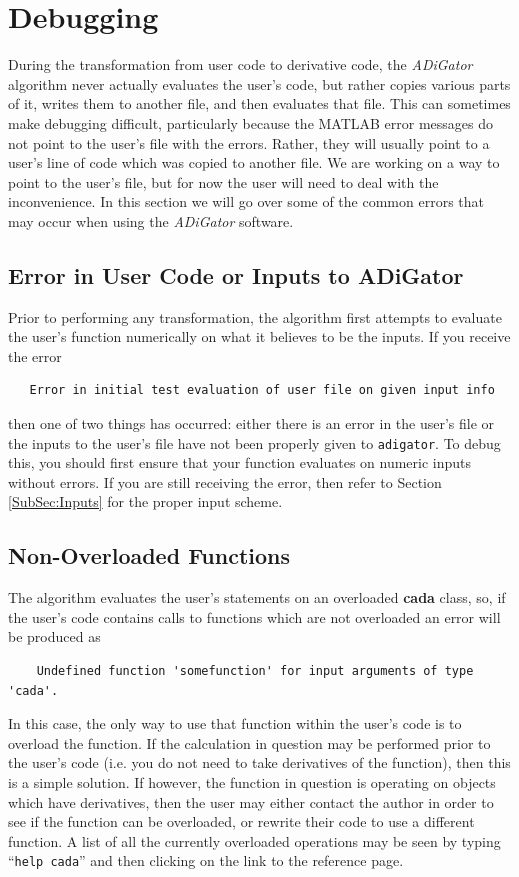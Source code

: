 \documentclass[10pt,pdftex]{article}
\begin{document}
\section{Debugging}
During the transformation from user code to derivative code, the \emph{ADiGator} algorithm never actually evaluates the user's code, but rather copies various parts of it, writes them to another file, and then evaluates that file. This can sometimes make debugging difficult, particularly because the MATLAB error messages do not point to the user's file with the errors. Rather, they will usually point to a user's line of code which was copied to another file. We are working on a way to point to the user's file, but for now the user will need to deal with the inconvenience.
In this section we will go over some of the common errors that may occur when using the \emph{ADiGator} software.
\subsection{Error in User Code or Inputs to ADiGator}
Prior to performing any transformation, the algorithm first attempts to evaluate the user's function numerically on what it believes to be the inputs.
If you receive the error
\begin{verbatim}
   Error in initial test evaluation of user file on given input info
\end{verbatim}
then one of two things has occurred: either there is an error in the user's file or the inputs to the user's file have not been properly given to \texttt{adigator}. To debug this, you should first ensure that your function evaluates on numeric inputs without errors. If you are still receiving the error, then refer to Section \ref{SubSec:Inputs} for the proper input scheme.
\subsection{Non-Overloaded Functions}
The algorithm evaluates the user's statements on an overloaded {\bf cada} class, so, if the user's code contains calls to functions which are not overloaded an error will be produced as
\begin{verbatim}
    Undefined function 'somefunction' for input arguments of type 'cada'.
\end{verbatim}
In this case, the only way to use that function within the user's code is to overload the function. If the calculation in question may be performed prior to the user's code (i.e. you do not need to take derivatives of the function), then this is a simple solution. If however, the function in question is operating on objects which have derivatives, then the user may either contact the author in order to see if the function can be overloaded, or rewrite their code to use a different function. A list of all the currently overloaded operations may be seen by typing ``\texttt{help cada}'' and then clicking on the link to the reference page.
\end{document}
